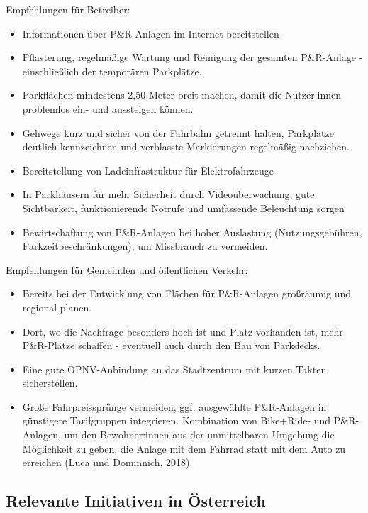 \documentclass[
]{book}
\providecommand{\tightlist}{%
  \setlength{\itemsep}{0pt}\setlength{\parskip}{0pt}}
\begin{document}
Empfehlungen für Betreiber:

\begin{itemize}
\tightlist
\item
  Informationen über P\&R-Anlagen im Internet bereitstellen
\item
  Pflasterung, regelmäßige Wartung und Reinigung der gesamten P\&R-Anlage - einschließlich der temporären Parkplätze.
\item
  Parkflächen mindestens 2,50 Meter breit machen, damit die Nutzer:innen problemlos ein- und aussteigen können.
\item
  Gehwege kurz und sicher von der Fahrbahn getrennt halten, Parkplätze deutlich kennzeichnen und verblasste Markierungen regelmäßig nachziehen.
\item
  Bereitstellung von Ladeinfrastruktur für Elektrofahrzeuge
\item
  In Parkhäusern für mehr Sicherheit durch Videoüberwachung, gute Sichtbarkeit, funktionierende Notrufe und umfassende Beleuchtung sorgen
\item
  Bewirtschaftung von P\&R-Anlagen bei hoher Auslastung (Nutzungsgebühren, Parkzeitbeschränkungen), um Missbrauch zu vermeiden.
\end{itemize}

Empfehlungen für Gemeinden und öffentlichen Verkehr:

\begin{itemize}
\tightlist
\item
  Bereits bei der Entwicklung von Flächen für P\&R-Anlagen großräumig und regional planen.
\item
  Dort, wo die Nachfrage besonders hoch ist und Platz vorhanden ist, mehr P\&R-Plätze schaffen - eventuell auch durch den Bau von Parkdecks.
\item
  Eine gute ÖPNV-Anbindung an das Stadtzentrum mit kurzen Takten sicherstellen.
\item
  Große Fahrpreissprünge vermeiden, ggf. ausgewählte P\&R-Anlagen in günstigere Tarifgruppen integrieren.
  Kombination von Bike+Ride- und P\&R-Anlagen, um den Bewohner:innen aus der unmittelbaren Umgebung die Möglichkeit zu geben, die Anlage mit dem Fahrrad statt mit dem Auto zu erreichen (Luca und Dommnich, 2018).
\end{itemize}

\hypertarget{relevante-initiativen-in-uxf6sterreich-25}{%
\subsection*{Relevante Initiativen in Österreich}\label{relevante-initiativen-in-uxf6sterreich-25}}
\end{document}
